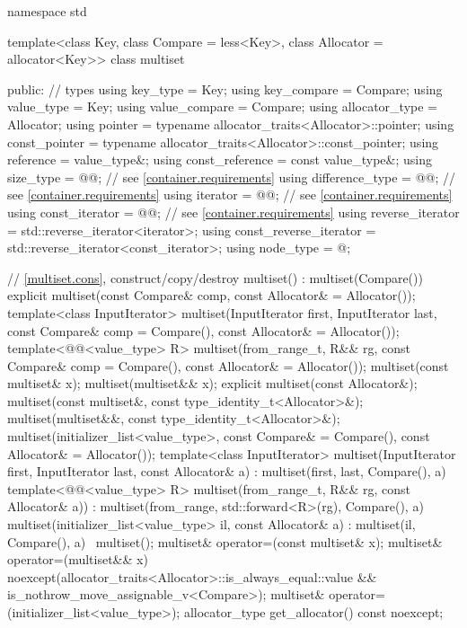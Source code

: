 \begin{codeblock}
namespace std {
  template<class Key, class Compare = less<Key>,
           class Allocator = allocator<Key>>
  class multiset {
  public:
    // types
    using key_type               = Key;
    using key_compare            = Compare;
    using value_type             = Key;
    using value_compare          = Compare;
    using allocator_type         = Allocator;
    using pointer                = typename allocator_traits<Allocator>::pointer;
    using const_pointer          = typename allocator_traits<Allocator>::const_pointer;
    using reference              = value_type&;
    using const_reference        = const value_type&;
    using size_type              = @@; // see \ref{container.requirements}
    using difference_type        = @@; // see \ref{container.requirements}
    using iterator               = @@; // see \ref{container.requirements}
    using const_iterator         = @@; // see \ref{container.requirements}
    using reverse_iterator       = std::reverse_iterator<iterator>;
    using const_reverse_iterator = std::reverse_iterator<const_iterator>;
    using node_type              = @\unspec@;

    // \ref{multiset.cons}, construct/copy/destroy
    multiset() : multiset(Compare()) { }
    explicit multiset(const Compare& comp, const Allocator& = Allocator());
    template<class InputIterator>
      multiset(InputIterator first, InputIterator last,
               const Compare& comp = Compare(), const Allocator& = Allocator());
    template<@@<value_type> R>
      multiset(from_range_t, R&& rg,
               const Compare& comp = Compare(), const Allocator& = Allocator());
    multiset(const multiset& x);
    multiset(multiset&& x);
    explicit multiset(const Allocator&);
    multiset(const multiset&, const type_identity_t<Allocator>&);
    multiset(multiset&&, const type_identity_t<Allocator>&);
    multiset(initializer_list<value_type>, const Compare& = Compare(),
             const Allocator& = Allocator());
    template<class InputIterator>
      multiset(InputIterator first, InputIterator last, const Allocator& a)
        : multiset(first, last, Compare(), a) { }
    template<@@<value_type> R>
      multiset(from_range_t, R&& rg, const Allocator& a))
        : multiset(from_range, std::forward<R>(rg), Compare(), a) { }
    multiset(initializer_list<value_type> il, const Allocator& a)
      : multiset(il, Compare(), a) { }
    ~multiset();
    multiset& operator=(const multiset& x);
    multiset& operator=(multiset&& x)
      noexcept(allocator_traits<Allocator>::is_always_equal::value &&
               is_nothrow_move_assignable_v<Compare>);
    multiset& operator=(initializer_list<value_type>);
    allocator_type get_allocator() const noexcept;

}}
\end{codeblock}
